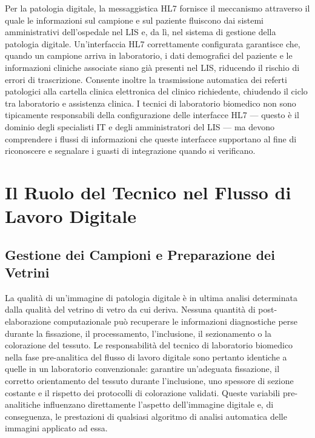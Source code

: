 Per la patologia digitale, la messaggistica HL7 fornisce il meccanismo attraverso il quale le informazioni sul campione e sul paziente fluiscono dai sistemi amministrativi dell'ospedale nel LIS e, da lì, nel sistema di gestione della patologia digitale. Un'interfaccia HL7 correttamente configurata garantisce che, quando un campione arriva in laboratorio, i dati demografici del paziente e le informazioni cliniche associate siano già presenti nel LIS, riducendo il rischio di errori di trascrizione. Consente inoltre la trasmissione automatica dei referti patologici alla cartella clinica elettronica del clinico richiedente, chiudendo il ciclo tra laboratorio e assistenza clinica. I tecnici di laboratorio biomedico non sono tipicamente responsabili della configurazione delle interfacce HL7 --- questo è il dominio degli specialisti IT e degli amministratori del LIS --- ma devono comprendere i flussi di informazioni che queste interfacce supportano al fine di riconoscere e segnalare i guasti di integrazione quando si verificano.

\section{Il Ruolo del Tecnico nel Flusso di Lavoro Digitale}

\subsection{Gestione dei Campioni e Preparazione dei Vetrini}

La qualità di un'immagine di patologia digitale è in ultima analisi determinata dalla qualità del vetrino di vetro da cui deriva. Nessuna quantità di post-elaborazione computazionale può recuperare le informazioni diagnostiche perse durante la fissazione, il processamento, l'inclusione, il sezionamento o la colorazione del tessuto. Le responsabilità del tecnico di laboratorio biomedico nella fase pre-analitica del flusso di lavoro digitale sono pertanto identiche a quelle in un laboratorio convenzionale: garantire un'adeguata fissazione, il corretto orientamento del tessuto durante l'inclusione, uno spessore di sezione costante e il rispetto dei protocolli di colorazione validati. Queste variabili pre-analitiche influenzano direttamente l'aspetto dell'immagine digitale e, di conseguenza, le prestazioni di qualsiasi algoritmo di analisi automatica delle immagini applicato ad essa.

